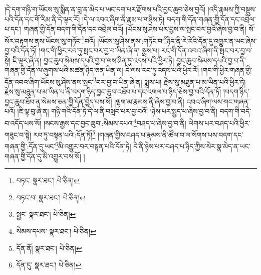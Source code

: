 །དེ་དག་གཉི་ག་ཡོངས་སུ་སྨིན་ན་བླ་ན་མེད་པ་ཡང་དག་པར་རྫོགས་པའི་བྱང་ཆུབ་ཅེས་བྱའོ། །འདི་རྣམས་ཀྱི་བསྡུས་པའི་དོན་དང་གོ་རིམ་ནི་དེ་ལྟར་རོ། །དེ་ལ་འབའ་ཞིག་ནི་རྣམ་པ་གཉིས་ཏེ། བདག་གི་དོན་གཞན་གྱི་དོན་དང་འབྲེལ་པ་དང་། གཞན་གྱི་དོན་བདག་གི་དོན་དང་འབྲེལ་བའོ། །ཡོངས་སུ་ཤེས་པར་བྱས་ལ་སྤང་བར་བྱའོ་ཞེས་བྱ་བ་ནི། སོ་སོར་བརྟགས་ནས་ཡོངས་སུ་གཏོང་\footnote{བཏང་  སྣར་ཐང་།  པེ་ཅིན། }བའོ། །ཡོངས་སུ་ཤེས་ནས་:གཏོང་བ་\footnote{བཏང་བ་  སྣར་ཐང་།  པེ་ཅིན། }ཉིད་ནི་རེ་རེའི་དོན་དུ་འགྱུར་ན་ཡང་ཞེས་བྱ་བའི་དོན་ཏོ། །གང་གི་ཕྱིར་རབ་ཏུ་སྤང་བར་བྱ་བ་ཡིན་ཞེ་ན། སྨྲས་པ། རང་གི་དོན་འབའ་ཞིག་ནི་སྤང་བར་བྱ་བ་སྟེ། ཇི་ལྟར་ཞེ་ན། བྱང་ཆུབ་སེམས་དཔའི་བྱ་བ་ལས་ཤིན་ཏུ་འདས་པའི་ཕྱིར་ཏེ། བྱང་ཆུབ་སེམས་དཔའི་བྱ་བ་ནི་གཞན་གྱི་དོན་ལ་ཞུགས་པའི་མཚན་ཉིད་ཅན་ཡིན་ལ། དེ་ལས་རབ་ཏུ་འདས་པའི་ཕྱིར་རོ། །གང་གི་ཕྱིར་གཞན་གྱི་དོན་འབའ་ཞིག་ཡོངས་སུ་ཤེས་ནས་སྤང་\footnote{སྦྱང་  སྣར་ཐང་།  པེ་ཅིན། }བར་བྱ་བ་ཡིན་ཞེ་ན། སྨྲས་པ། རྗེས་སུ་མཐུན་པ་མ་ཡིན་པའི་ཕྱིར་ཏེ། རྗེས་སུ་མཐུན་པ་མ་ཡིན་པ་ནི་བདག་ཉིད་བྱང་ཆུབ་འཐོབ་པ་དང་འགལ་བ་ཉིད་ཅེས་བྱ་བའི་དོན་ཏོ། །བདག་ཉིད་བྱང་ཆུབ་ཐོབ་ན་སེམས་ཅན་གྱི་དོན་བྱེད་པས་སོ། །ལྷག་མ་རྣམས་ནི་ཞེས་བྱ་བ་ནི། འབའ་ཞིག་ལས་གང་གཞན་པའོ། །ཇི་ལྟ་བུ་ཞེ་ན། གཉི་གའི་དོན་ཏེ་དེ་ལ་ནི་བསླབ་པར་བྱ་བའོ། །ཉེས་པར་སྤྱད་པ་ཞེས་བྱ་བ་ནི། བདག་གི་བདེ་བ་འདོད་པས་སོ། །སངས་རྒྱས་དང་བྱང་ཆུབ་:སེམས་དཔའ་\footnote{སེམས་དཔས་  སྣར་ཐང་།  པེ་ཅིན། }བཤད་པ་ཞེས་བྱ་བ་ནི། ལེགས་པར་བཤད་པའི་ཕྱིར་གཟུང་བ་སྟེ། རབ་ཏུ་བསྟན་པའི་:དོན་ཏོ།\footnote{དོན་ནོ།  སྣར་ཐང་།  པེ་ཅིན། } །གཞན་གྱིས་བཤད་པ་རྣམས་ནི་ཚོལ་བ་ལ་སོགས་པས་བདག་དང་གཞན་གྱི་:དོན་དུ་ཡང་\footnote{དོན་དུ་  སྣར་ཐང་།  པེ་ཅིན། }མི་འགྱུར་བར་བསྟན་པའི་དོན་ཏེ། དེ་ནི་ཉེས་པར་བཤད་པ་ཉིད་ཀྱིས་སེར་སྣ་མེད་ན་ཡང་གཞན་གྱི་དོན་དུ་མི་འགྱུར་བས་སོ། །
